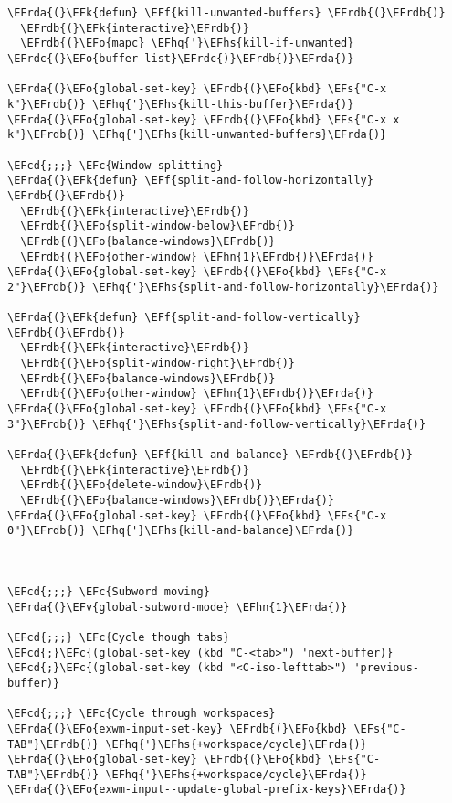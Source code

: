 \documentclass[a4wide,10pt]{article}
\newcommand{\EFc}[1]{\textcolor{EFc}{#1}} %
\newcommand{\EFcd}[1]{\textcolor{EFcd}{#1}} %
\newcommand{\EFs}[1]{\textcolor{EFs}{#1}} %
\newcommand{\EFk}[1]{\textcolor{EFk}{#1}} %
\newcommand{\EFf}[1]{\textcolor{EFf}{#1}} %
\newcommand{\EFv}[1]{\textcolor{EFv}{#1}} %
\newcommand{\EFo}[1]{\textcolor{EFo}{#1}} %
\newcommand{\EFhn}[1]{\textcolor{EFhn}{\textbf{#1}}} %
\newcommand{\EFhq}[1]{\textcolor{EFhq}{#1}} %
\newcommand{\EFhs}[1]{\textcolor{EFhs}{#1}} %
\newcommand{\EFrda}[1]{\textcolor{EFrda}{#1}} %
\newcommand{\EFrdb}[1]{\textcolor{EFrdb}{#1}} %
\newcommand{\EFrdc}[1]{\textcolor{EFrdc}{#1}} %
\begin{document}
\begin{Code}
\begin{Verbatim}
\EFrda{(}\EFk{defun} \EFf{kill-unwanted-buffers} \EFrdb{(}\EFrdb{)}
  \EFrdb{(}\EFk{interactive}\EFrdb{)}
  \EFrdb{(}\EFo{mapc} \EFhq{'}\EFhs{kill-if-unwanted} \EFrdc{(}\EFo{buffer-list}\EFrdc{)}\EFrdb{)}\EFrda{)}

\EFrda{(}\EFo{global-set-key} \EFrdb{(}\EFo{kbd} \EFs{"C-x k"}\EFrdb{)} \EFhq{'}\EFhs{kill-this-buffer}\EFrda{)}
\EFrda{(}\EFo{global-set-key} \EFrdb{(}\EFo{kbd} \EFs{"C-x x k"}\EFrdb{)} \EFhq{'}\EFhs{kill-unwanted-buffers}\EFrda{)}

\EFcd{;;;} \EFc{Window splitting}
\EFrda{(}\EFk{defun} \EFf{split-and-follow-horizontally} \EFrdb{(}\EFrdb{)}
  \EFrdb{(}\EFk{interactive}\EFrdb{)}
  \EFrdb{(}\EFo{split-window-below}\EFrdb{)}
  \EFrdb{(}\EFo{balance-windows}\EFrdb{)}
  \EFrdb{(}\EFo{other-window} \EFhn{1}\EFrdb{)}\EFrda{)}
\EFrda{(}\EFo{global-set-key} \EFrdb{(}\EFo{kbd} \EFs{"C-x 2"}\EFrdb{)} \EFhq{'}\EFhs{split-and-follow-horizontally}\EFrda{)}

\EFrda{(}\EFk{defun} \EFf{split-and-follow-vertically} \EFrdb{(}\EFrdb{)}
  \EFrdb{(}\EFk{interactive}\EFrdb{)}
  \EFrdb{(}\EFo{split-window-right}\EFrdb{)}
  \EFrdb{(}\EFo{balance-windows}\EFrdb{)}
  \EFrdb{(}\EFo{other-window} \EFhn{1}\EFrdb{)}\EFrda{)}
\EFrda{(}\EFo{global-set-key} \EFrdb{(}\EFo{kbd} \EFs{"C-x 3"}\EFrdb{)} \EFhq{'}\EFhs{split-and-follow-vertically}\EFrda{)}

\EFrda{(}\EFk{defun} \EFf{kill-and-balance} \EFrdb{(}\EFrdb{)}
  \EFrdb{(}\EFk{interactive}\EFrdb{)}
  \EFrdb{(}\EFo{delete-window}\EFrdb{)}
  \EFrdb{(}\EFo{balance-windows}\EFrdb{)}\EFrda{)}
\EFrda{(}\EFo{global-set-key} \EFrdb{(}\EFo{kbd} \EFs{"C-x 0"}\EFrdb{)} \EFhq{'}\EFhs{kill-and-balance}\EFrda{)}



\EFcd{;;;} \EFc{Subword moving}
\EFrda{(}\EFv{global-subword-mode} \EFhn{1}\EFrda{)}

\EFcd{;;;} \EFc{Cycle though tabs}
\EFcd{;}\EFc{(global-set-key (kbd "C-<tab>") 'next-buffer)}
\EFcd{;}\EFc{(global-set-key (kbd "<C-iso-lefttab>") 'previous-buffer)}

\EFcd{;;;} \EFc{Cycle through workspaces}
\EFrda{(}\EFo{exwm-input-set-key} \EFrdb{(}\EFo{kbd} \EFs{"C-TAB"}\EFrdb{)} \EFhq{'}\EFhs{+workspace/cycle}\EFrda{)}
\EFrda{(}\EFo{global-set-key} \EFrdb{(}\EFo{kbd} \EFs{"C-TAB"}\EFrdb{)} \EFhq{'}\EFhs{+workspace/cycle}\EFrda{)}
\EFrda{(}\EFo{exwm-input--update-global-prefix-keys}\EFrda{)}


\end{Verbatim}
\end{Code}
\end{document}
